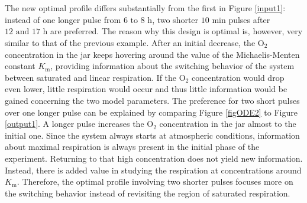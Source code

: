 \\
\\
The new optimal profile differs substantially from the first in Figure \ref{input1}: instead of one longer pulse from $6 \text{ to } 8 \text{ h}$, two shorter $10 \text{ min}$ pulses after $12 \text{ and } 17 \text{ h}$ are preferred. The reason why this design is optimal is, however, very similar to that of the previous example. After an initial decrease, the $\text{O}_2$ concentration in the jar keeps hovering around the value of the Michaelis-Menten constant $K_\text{m}$, providing information about the switching behavior of the system between saturated and linear respiration. If the $\text{O}_2$ concentration would drop even lower, little respiration would occur and thus little information would be gained concerning the two model parameters. The preference for two short pulses over one longer pulse can be explained by comparing Figure \ref{figODE2} to Figure \ref{output1}. A longer pulse increases the $\text{O}_2$ concentration in the jar almost to the initial one. Since the system always starts at atmospheric conditions, information about maximal respiration is always present in the initial phase of the experiment. Returning to that high concentration does not yield new information. Instead, there is added value in studying the respiration at concentrations around $K_\text{m}$. Therefore, the optimal profile involving two shorter pulses focuses more on the switching behavior instead of revisiting the region of saturated respiration.
